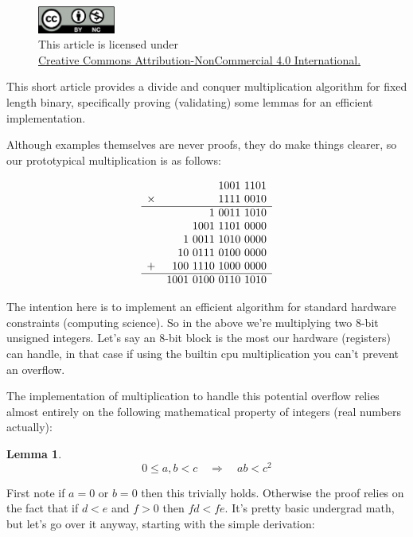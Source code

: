 \documentclass[twoside]{article}
\newtheorem{lemma}{Lemma}[section]
\begin{document}
\begin{figure}[h]
\centering
\includegraphics[width=1in]{../../../cc-by-nc.png}\\[0.1in]
\tiny This article is licensed under \\
\href{http://creativecommons.org/licenses/by-nc/4.0/}
{Creative Commons Attribution-NonCommercial 4.0 International.}\\[0.3in]
\end{figure}

This short article provides a divide and conquer multiplication algorithm for fixed length binary,
specifically proving (validating) some lemmas for an efficient implementation.

Although examples themselves are never proofs, they do make things clearer, so our prototypical multiplication is as follows:

$$ \begin{array}{rr}
	& 1001\ 1101 \\
 \times & 1111\ 0010 \\\hline
	& 1\ 0011\ 1010 \\
	& 1001\ 1101\ 0000 \\
	& 1\ 0011\ 1010\ 0000 \\
	& 10\ 0111\ 0100\ 0000 \\
      + & 100\ 1110\ 1000\ 0000 \\\hline
	& 1001\ 0100\ 0110\ 1010
\end{array} $$

The intention here is to implement an efficient algorithm for standard hardware constraints (computing science).
So in the above we're multiplying two 8-bit unsigned integers. Let's say an 8-bit block is the most our hardware
(registers) can handle, in that case if using the builtin cpu multiplication you can't prevent an overflow.

The implementation of multiplication to handle this potential overflow relies almost entirely on the following
mathematical property of integers (real numbers actually):

\begin{lemma} $$ 0\leq a,b < c\quad\Longrightarrow\quad ab < c^2 $$
\end{lemma}

First note if $ a=0 $ or $ b=0 $ then this trivially holds. Otherwise the proof relies on the fact that
if $ d < e $ and $ f > 0 $ then $ fd < fe $. It's pretty basic undergrad math, but let's go over it anyway,
starting with the simple derivation:
\end{document}
